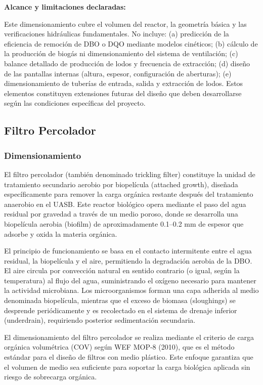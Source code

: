 \documentclass[12pt,a4paper]{article}
\begin{document}
\textbf{Alcance y limitaciones declaradas:}

Este dimensionamiento cubre el volumen del reactor, la geometría básica y las verificaciones hidráulicas fundamentales. No incluye: (a) predicción de la eficiencia de remoción de DBO o DQO mediante modelos cinéticos; (b) cálculo de la producción de biogás ni dimensionamiento del sistema de ventilación; (c) balance detallado de producción de lodos y frecuencia de extracción; (d) diseño de las pantallas internas (altura, espesor, configuración de aberturas); (e) dimensionamiento de tuberías de entrada, salida y extracción de lodos. Estos elementos constituyen extensiones futuras del diseño que deben desarrollarse según las condiciones específicas del proyecto.

\subsection{Filtro Percolador}

\subsubsection{Dimensionamiento}

El filtro percolador (también denominado trickling filter) constituye la unidad de tratamiento secundario aerobio por biopelícula (attached growth), diseñada específicamente para remover la carga orgánica restante después del tratamiento anaerobio en el UASB. Este reactor biológico opera mediante el paso del agua residual por gravedad a través de un medio poroso, donde se desarrolla una biopelícula aerobia (biofilm) de aproximadamente 0.1--0.2 mm de espesor que adsorbe y oxida la materia orgánica.

El principio de funcionamiento se basa en el contacto intermitente entre el agua residual, la biopelícula y el aire, permitiendo la degradación aerobia de la DBO. El aire circula por convección natural en sentido contrario (o igual, según la temperatura) al flujo del agua, suministrando el oxígeno necesario para mantener la actividad microbiana. Los microorganismos forman una capa adherida al medio denominada biopelícula, mientras que el exceso de biomasa (sloughings) se desprende periódicamente y es recolectado en el sistema de drenaje inferior (underdrain), requiriendo posterior sedimentación secundaria.

El dimensionamiento del filtro percolador se realiza mediante el criterio de carga orgánica volumétrica (COV) según WEF MOP-8 (2010), que es el método estándar para el diseño de filtros con medio plástico. Este enfoque garantiza que el volumen de medio sea suficiente para soportar la carga biológica aplicada sin riesgo de sobrecarga orgánica.
\end{document}
